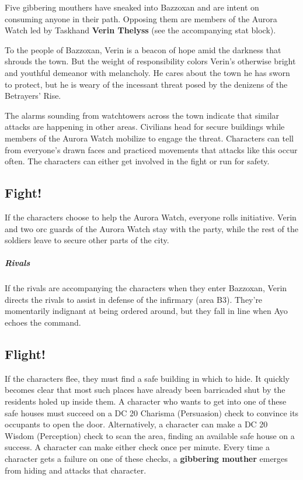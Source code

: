 \documentclass[10pt,a4paper,twoside,bg=print,twocolumn,openany,nodeprecatedcode]{dndbook}
\begin{document}
Five gibbering mouthers have sneaked into Bazzoxan and are intent on consuming anyone in their path. Opposing them are members of the Aurora Watch led by Taskhand \textbf{Verin Thelyss} (see the accompanying stat block).

To the people of Bazzoxan, Verin is a beacon of hope amid the darkness that shrouds the town. But the weight of responsibility colors Verin's otherwise bright and youthful demeanor with melancholy. He cares about the town he has sworn to protect, but he is weary of the incessant threat posed by the denizens of the Betrayers' Rise.

The alarms sounding from watchtowers across the town indicate that similar attacks are happening in other areas. Civilians head for secure buildings while members of the Aurora Watch mobilize to engage the threat. Characters can tell from everyone's drawn faces and practiced movements that attacks like this occur often. The characters can either get involved in the fight or run for safety.

\subsection{Fight!}
If the characters choose to help the Aurora Watch, everyone rolls initiative. Verin and two orc guards of the Aurora Watch stay with the party, while the rest of the soldiers leave to secure other parts of the city.

\subparagraph{Rivals}
If the rivals are accompanying the characters when they enter Bazzoxan, Verin directs the rivals to assist in defense of the infirmary (area B3). They're momentarily indignant at being ordered around, but they fall in line when Ayo echoes the command.

\subsection{Flight!}
If the characters flee, they must find a safe building in which to hide. It quickly becomes clear that most such places have already been barricaded shut by the residents holed up inside them. A character who wants to get into one of these safe houses must succeed on a DC 20 Charisma (Persuasion) check to convince its occupants to open the door. Alternatively, a character can make a DC 20 Wisdom (Perception) check to scan the area, finding an available safe house on a success. A character can make either check once per minute. Every time a character gets a failure on one of these checks, a \textbf{gibbering mouther} emerges from hiding and attacks that character.
\end{document}
